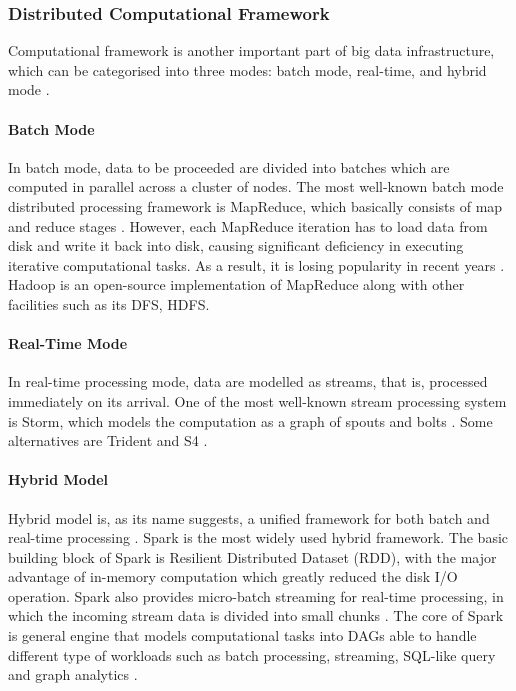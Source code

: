 \documentclass[conference]{IEEEtran}
\begin{document}
\hypertarget{distributed-computational-framework}{%
\subsubsection{Distributed Computational
Framework}\label{distributed-computational-framework}}

Computational framework is another important part of big data
infrastructure, which can be categorised into three modes: batch mode,
real-time, and hybrid mode \autocite{Gupta2016}.

\hypertarget{batch-mode}{%
\paragraph{Batch Mode}\label{batch-mode}}

In batch mode, data to be proceeded are divided into batches which are
computed in parallel across a cluster of nodes. The most well-known
batch mode distributed processing framework is MapReduce, which
basically consists of map and reduce stages
\autocite{hashem_rise_2015,Gupta2016}. However, each MapReduce iteration
has to load data from disk and write it back into disk, causing
significant deficiency in executing iterative computational tasks. As a
result, it is losing popularity in recent years \autocite{Gupta2016}.
Hadoop is an open-source implementation of MapReduce along with other
facilities such as its DFS, HDFS.

\hypertarget{real-time-mode}{%
\paragraph{Real-Time Mode}\label{real-time-mode}}

In real-time processing mode, data are modelled as streams, that is,
processed immediately on its arrival. One of the most well-known stream
processing system is Storm, which models the computation as a graph of
spouts and bolts \autocite{Gupta2016}. Some alternatives are Trident and
S4 \autocite{Gupta2016,hu2014}.

\hypertarget{hybrid-model}{%
\paragraph{Hybrid Model}\label{hybrid-model}}

Hybrid model is, as its name suggests, a unified framework for both
batch and real-time processing \autocite{Gupta2016}. Spark is the most
widely used hybrid framework. The basic building block of Spark is
Resilient Distributed Dataset (RDD), with the major advantage of
in-memory computation which greatly reduced the disk I/O operation.
Spark also provides micro-batch streaming for real-time processing, in
which the incoming stream data is divided into small chunks
\autocite{Gupta2016}. The core of Spark is general engine that models
computational tasks into DAGs able to handle different type of workloads
such as batch processing, streaming, SQL-like query and graph analytics
\autocite{hashem_rise_2015}.
\end{document}
